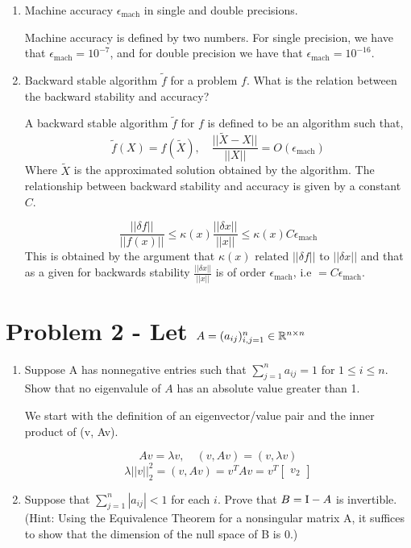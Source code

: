 \documentclass{article}
\begin{document}
\begin{enumerate}
\item Machine accuracy $\epsilon_{\text{mach}}$ in single and double precisions.

Machine accuracy is defined by two numbers. For single precision, we have that $\epsilon_{\text{mach}} = 10^{-7}$, and for double precision we have that $\epsilon_{\text{mach}} = 10^{-16}$. 

\item Backward stable algorithm $\tilde{f}$ for a problem $f$. What is the relation between the backward stability and accuracy?

A backward stable algorithm $\tilde{f}$ for $f$ is defined to be an algorithm such that, 
\[
    \tilde{f}(X) = f(\tilde{X}), \quad \frac{||\tilde{X} - X||}{||X||} = O(\epsilon_{\text{mach}})
\]
Where $\tilde{X}$ is the approximated solution obtained by the algorithm. The relationship between backward stability and accuracy is given by a constant $C$. 

\[
    \frac{||\delta f||}{||f(x)||} \le \kappa(x)\frac{||\delta x||}{||x||} \le \kappa(x)C\epsilon_{\text{mach}}
\]
This is obtained by the argument that $\kappa(x)$ related $||\delta f||$ to $||\delta x||$ and that as a given for backwards stability $\frac{||\delta x||}{||x||}$ is of order $\epsilon_{\text{mach}}$, i.e $= C\epsilon_{\text{mach}}$.


\end{enumerate}

\section{Problem 2 - Let $A = (a_{ij})_{i,j=1}^n \in \mathbb{R}^{n\times n}$}
\begin{enumerate}
\item Suppose A has nonnegative entries such that $\sum_{j=1}^n a_{ij} = 1$ for $1 \le i \le n$. Show that no eigenvalule of $A$ has an absolute value greater than 1. 

We start with the definition of an eigenvector/value pair and the inner product of (v, Av). 

\[
    Av = \lambda v, \quad (v, Av) = (v, \lambda v)
\]
\[
    \lambda||v||_2^2 =  (v, Av) = v^TAv = v^T \left[\begin{array}{c} v_2 \end{array}\right]
\]

\item Suppose that $\sum_{j=1}^n |a_{ij}| < 1$ for each $i$. Prove that $B = \mathrm{I} - A$ is invertible.  (Hint: Using the Equivalence Theorem for a nonsingular matrix A, it suffices to show that the dimension of the null space of B is 0.)

\end{enumerate}
\end{document}
